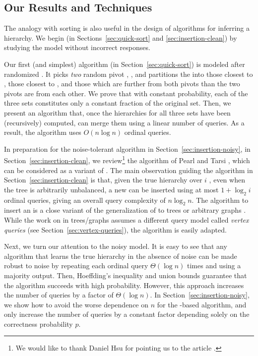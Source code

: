 \subsection*{Our Results and Techniques}

The analogy with sorting is also useful in the design of algorithms
for inferring a hierarchy.
We begin (in Sections~\ref{sec:quick-sort} and \ref{sec:insertion-clean})
by studying the model without incorrect responses.

Our first (and simplest) algorithm (in Section~\ref{sec:quick-sort})
is modeled after randomized \QuickSort.
It picks \emph{two} random pivot \elements \PivotA, \PivotB,
and partitions the \elements into those closest to \PivotA,
those closest to \PivotB,
and those which are further from both pivots
than the two pivots are from each other.
We prove that with constant probability,
each of the three sets constitutes
only a constant fraction of the original set.
Then, we present an algorithm that, 
once the hierarchies for all three sets have been (recursively) computed,
can merge them using a linear number of queries.
As a result, the algorithm uses $O(n \log n)$ ordinal queries.

In preparation for the noise-tolerant algorithm in
Section~\ref{sec:insertion-noisy},
in Section~\ref{sec:insertion-clean},
we review\footnote{We would like to thank Daniel Hsu for
pointing us to the article \cite{pearl-tarsi:1986:strucuting}.}
the algorithm of Pearl and Tarsi
\cite{pearl-tarsi:1986:strucuting},
which can be considered as a variant of \InsertionSort. 
The main observation
guiding the algorithm in Section~\ref{sec:insertion-clean}
is that, given the true hierarchy over $i$ \elements,
even when the tree is arbitrarily unbalanced, 
a new \element can be inserted using at most
$1 + \log_2 i$ ordinal queries,
giving an overall query complexity of $n \log_2 n$.
The algorithm to insert an \element is a close variant
of the generalization of \binarysearch to trees or arbitrary graphs
\cite{onak-parys:2006:tree-vertex-linear,%
mozes-onak-weimann:2008:tree-edge-linear,%
2016:binary-search}.
While the work on \binarysearch in trees/graphs
assumes a different query model called \emph{vertex queries}
(see Section~\ref{sec:vertex-queries}),
the algorithm is easily adapted.

Next, we turn our attention to the noisy model.
It is easy to see that any algorithm
that learns the true hierarchy in the absence of noise
can be made robust to noise by repeating each ordinal query
$\Theta(\log n)$ times and using a majority output.
Then, Hoeffding's inequality and union bounds guarantee that
the algorithm succeeds with high probability.
However, this approach increases the
number of queries by a factor of $\Theta(\log n)$.
In Section~\ref{sec:insertion-noisy},
we show how to avoid the worse dependence on $n$
for the \InsertionSort-based algorithm,
and only increase the number of queries by a constant factor
depending solely on the correctness probability $p$.

